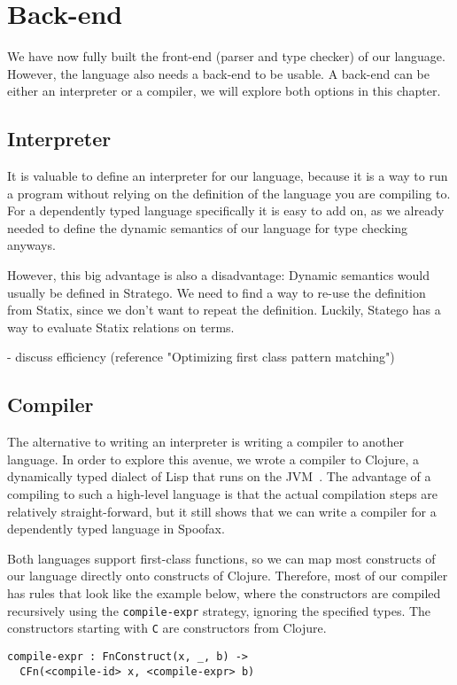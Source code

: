 \chapter{Back-end}
\label{ch:backend}

We have now fully built the front-end (parser and type checker) of our language. However, the language also needs a back-end to be usable. A back-end can be either an interpreter or a compiler, we will explore both options in this chapter.

\section{Interpreter}
It is valuable to define an interpreter for our language, because it is a way to run a program without relying on the definition of the language you are compiling to. For a dependently typed language specifically it is easy to add on, as we already needed to define the dynamic semantics of our language for type checking anyways. 

However, this big advantage is also a disadvantage: Dynamic semantics would usually be defined in Stratego. We need to find a way to re-use the definition from Statix, since we don't want to repeat the definition. Luckily, Statego has a way to evaluate Statix relations on terms. 

- discuss efficiency (reference "Optimizing first class pattern matching")

\section{Compiler}
The alternative to writing an interpreter is writing a compiler to another language. In order to explore this avenue, we wrote a compiler to Clojure, a dynamically typed dialect of Lisp that runs on the JVM~\cite{clojure}. The advantage of a compiling to such a high-level language is that the actual compilation steps are relatively straight-forward, but it still shows that we can write a compiler for a dependently typed language in Spoofax.

Both languages support first-class functions, so we can map most constructs of our language directly onto constructs of Clojure. Therefore, most of our compiler has rules that look like the example below, where the constructors are compiled recursively using the \verb|compile-expr| strategy, ignoring the specified types. The constructors starting with \verb|C| are constructors from Clojure. 
\begin{lstlisting}
compile-expr : FnConstruct(x, _, b) -> 
  CFn(<compile-id> x, <compile-expr> b)
\end{lstlisting}

